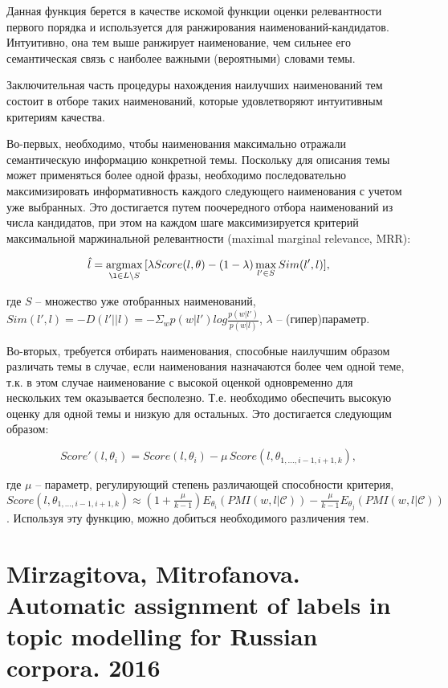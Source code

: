 Данная функция берется в качестве искомой функции оценки релевантности первого порядка и используется для ранжирования наименований-кандидатов. Интуитивно, она тем выше ранжирует наименование, чем сильнее его семантическая связь с наиболее важными (вероятными) словами темы.

Заключительная часть процедуры нахождения наилучших наименований тем состоит в отборе таких наименований, которые удовлетворяют интуитивным критериям качества. 

Во-первых, необходимо, чтобы наименования максимально отражали семантическую информацию конкретной темы. Поскольку для описания темы может применяться более одной фразы, необходимо последовательно максимизировать информативность каждого следующего наименования с учетом уже выбранных. Это достигается путем поочередного отбора наименований из числа кандидатов, при этом на каждом шаге максимизируется критерий максимальной маржинальной релевантности (maximal marginal relevance, MRR):

\[\hat{l} = \argmax_{\l \in L\setminus S} \, [\lambda Score(l, \theta) - (1-\lambda)\max_{l' \in S} Sim(l', l)], \]

\noindent где $S$ -- множество уже отобранных наименований, $Sim(l', l) = -D(l'||l) = -\Sigma_w p(w|l') log \frac{p(w|l')}{p(w|l)}$, $\lambda$ -- (гипер)параметр.

Во-вторых, требуется отбирать наименования, способные наилучшим образом различать темы в случае, если наименования назначаются более чем одной теме, т.к. в этом случае наименование с высокой оценкой одновременно для нескольких тем оказывается бесполезно. Т.е. необходимо обеспечить высокую оценку для одной темы и низкую для остальных. Это достигается следующим образом:

\[Score'(l, \theta_i) = Score(l, \theta_i) - \mu\,Score(l, \theta_{1,\ldots, i-1,i+1, k}),\]

\noindent где $\mu$ -- параметр, регулирующий степень различающей способности критерия, $Score(l, \theta_{1,\ldots, i-1,i+1, k}) \approx (1 + \frac{\mu}{k-1})E_{\theta_i}(PMI(w,l|\mathcal{C})) - \frac{\mu}{k-1}E_{\theta_j}(PMI(w,l|\mathcal{C}))$. Используя эту функцию, можно добиться необходимого различения тем.


\section{Mirzagitova, Mitrofanova. Automatic assignment of labels in topic modelling for Russian corpora. 2016}

